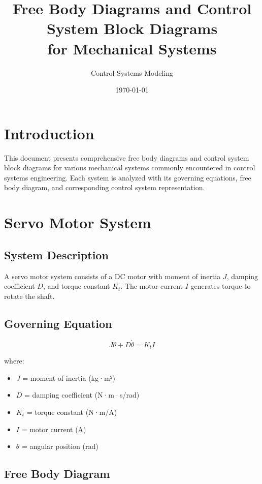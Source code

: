 \documentclass[12pt,letterpaper]{article}
\title{Free Body Diagrams and Control System Block Diagrams\\for Mechanical Systems}
\author{Control Systems Modeling}
\date{\today}
\begin{document}
\maketitle

\tableofcontents
\newpage

\section{Introduction}

This document presents comprehensive free body diagrams and control system block diagrams for various mechanical systems commonly encountered in control systems engineering. Each system is analyzed with its governing equations, free body diagram, and corresponding control system representation.

\section{Servo Motor System}

\subsection{System Description}

A servo motor system consists of a DC motor with moment of inertia $J$, damping coefficient $D$, and torque constant $K_t$. The motor current $I$ generates torque to rotate the shaft.

\subsection{Governing Equation}

\begin{equation}
J\ddot{\theta} + D\dot{\theta} = K_t I
\end{equation}

where:
\begin{itemize}
    \item $J$ = moment of inertia (kg·m²)
    \item $D$ = damping coefficient (N·m·s/rad)
    \item $K_t$ = torque constant (N·m/A)
    \item $I$ = motor current (A)
    \item $\theta$ = angular position (rad)
\end{itemize}

\subsection{Free Body Diagram}
\end{document}
